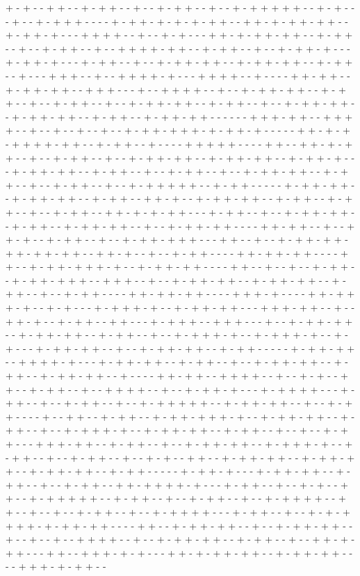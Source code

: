 + - + - - + + - - + - + + - - + - - + - + + - - + - - + - + + + + + - - + - + - - - + - - + - + + + - - - - + - + + - + - + - + - + + - - + + - + - + + - + + - - + - + + - + - - - + + + + - - + - - + - + - - - + + - + - + + - + + - - + - + + - - + - - + - + + - - + - - + + + + - + + - - + - + + - - + - - + - + + - + - - - + - + + - + - - - + - + + - - + - - + - + + - + + - - + - + + - + + - - + - + + - - + - - - + + + - - + - - + + + + - + - - - + + + + - - + - - - - + + - + + - - + - + + - + + - - + + + - - - + - - + + + + - - + - - + - + + - + + - - + - + + - - + - - + - + + - - + - - + - + + - + + - - + - + + - - + - - + - + + - + + - - + - + + - + + - - + - + + - - + - + + - + + - - - - - - + + + - + + - - + + + + - - + - - + - - + - - + - - + - + + - + + + - + - + + - + - - - - - + + - + - + - + + + + - + + - - + - + + - - + - - - - + + + + + - - - - + + - - + + - + - + + - - + - - + - + + - - + - - + - + + - + + - - + - + + - + + - - + - + + - + - - - + - + + - + + - - + - + + - - + - - + - + + - - + - - + - + + - + + - - + - + + - - + - - + - + + - - + - - + - + + + + + - - + - + + - - - - - + - + + - + + - - + - + + - + + - - + - + + - - + + - + - - + - + + - + + - - + - + + - - + - + + - - + - - + - + + - - + + - + - + - + + - - - + - + + - - + - - + - + + - + + - - + - + + - - + - + + - + + - - + - - + - + + - + + - - - - + + - + + - - + - - + + - + - - + - + + - - + - - + - + + - + + + - - - + + - - + - - + - + + - + + - + + - + + - + + - - + + - + - - + - - + - + + - - - - + + - + + - + + - - - - + + - - + - + + - + + + - + - - + - + + - + + - - - - + + - - + - - + - - + - + + - - + - + + - + + + - - + + + - - + - - + - + + - + + - - + - + + - + + - - + - + + - - + - - + - + + - - - - + + - + + - + + - - - - + + + - + - - - - + + - + + + - + - - + - + - - - + - + + + - + - - + - + + - + + - - - + + + - + + - - + - - + + - + - - + - + + - - + + - - - + - + + + - - + + + - - - + - - + - + + - + + - - + - + + - + + - - + - + + - - + - - + - + + + - + - - + - + + + - + - - + - + - - - + - + + - + + - - + - - + - + + - + + - - + - + + - - - - - + - + + - + + - - + + + + - + - - - + - + + - + + - - + - + + - - + - - + - + + - + + - - + - + + - - + - + + - + + - - + - - - - + + - + + - - + + + + - - + - - + - + - - + + - - + - + + - - + - - + + + + - - + - - + - + + - + - - - + - + + + + - - - + - + + - - + - - + - + + - - + - - + - + + + + + - - + - + + - + + - - + - - + - + + - - - - + - - + + - - + - + + - - + - + + - + + + - + - - + - + + - + + - - + - + + - - + - - + - + + + - + - - + - + + - + + - - + - + + - - + - - + - - + - + + - - - + + + - + + - - + - + + - - + - - + - + + - + + - - + - + + + - + - - + - + + - - + - - + - + + - - + - - + - + - - + + - - + - + + - + + - - + - + + - + + - - + - + + - + + - - + - + + - - - - - + - + + - + - - - + - + + - + + - - + - + + - - + - - + - + + - - + + - + + + + - + - - - + - + + - - + - - + - + - - + + - - + - + + + + + - - + - + + - - + - - + - + + - - + - - + - + + + + - - + + - - + - - + - - + - + + - - + - - + - + + + + - - - + - + + - - + - - + - + - + + + + - + - + + - + + - - - - + + - - + - + + - + + - - + - - + - + + - + + - - + - - + - - + - - + + + + - - + - - + - + + - + + - - + - + + - - + - - + + - + - + + - - - + + - - + + + - + - + - - - + + - + - + + - + + - - + - + + - + + - - - - + + + - + - + + - - 